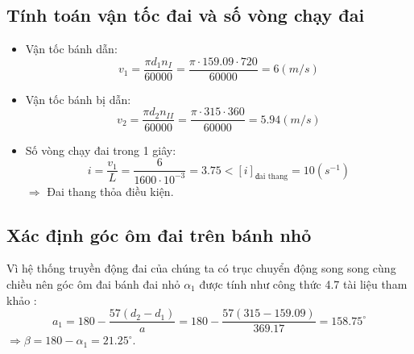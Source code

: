         \subsection{Tính toán vận tốc đai và số vòng chạy đai}  
            \begin{itemize}
                \item Vận tốc bánh dẫn:
                    $$v_1 = \frac{\pi d_{1} n_{I}}{60000} = \frac{\pi \cdot 159.09 \cdot 720}{60000} = 6 (m/s)$$
                \item Vận tốc bánh bị dẫn:
                    $$v_2 = \frac{\pi d_{2} n_{II}}{60000} = \frac{\pi \cdot 315 \cdot 360}{60000} = 5.94 (m/s)$$  
                \item Số vòng chạy đai trong 1 giây:
                    $$i = \frac{v_1}{L} = \frac{6}{1600 \cdot 10^{-3}} = 3.75 < [i]_{\text{đai thang}} = 10 (s^{-1}) $$
                    $\Rightarrow$ Đai thang thỏa điều kiện.
            \end{itemize}
        \subsection{Xác định góc ôm đai trên bánh nhỏ}
            \hspace*{0.6cm}Vì hệ thống truyền động đai của chúng ta có trục chuyển động song song cùng chiều nên góc ôm đai bánh đai nhỏ $\alpha_1$ được tính như công thức 4.7 tài liệu tham khảo \cite{tltk1}:
            $$a_{1} = 180 - \frac{57(d_2 - d_1)}{a} = 180 - \frac{57(315 - 159.09)}{369.17} = 158.75^{\circ}$$
            $\Rightarrow \beta = 180 - \alpha_1 = 21.25^{\circ}$.
